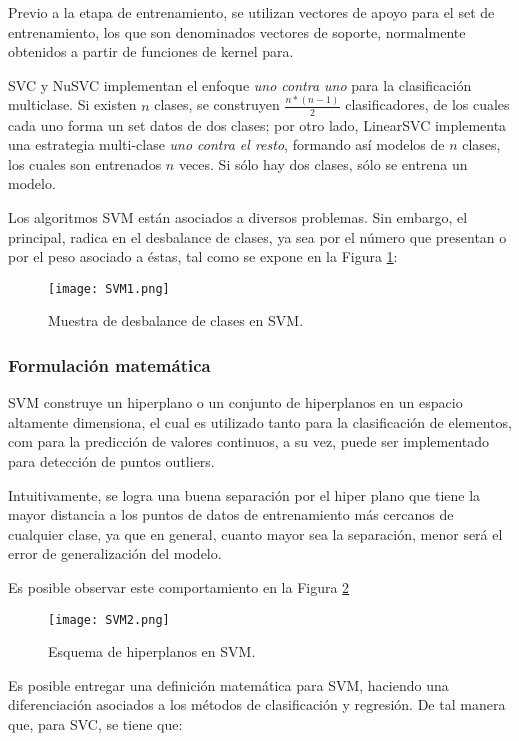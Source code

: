 Previo a la etapa de entrenamiento, se utilizan vectores de apoyo para el set de entrenamiento, los que son denominados vectores de soporte, normalmente obtenidos a partir de funciones de kernel para.

SVC y NuSVC implementan el enfoque \textit{uno contra uno} para la clasificación multiclase. Si existen $n$ clases, se construyen $\frac{n*(n-1)}{2}$ clasificadores, de los cuales cada uno forma un set datos de dos clases; por otro lado, LinearSVC implementa una estrategia multi-clase \textit{uno contra el resto}, formando así modelos de $n$ clases, los cuales son entrenados $n$ veces. Si sólo hay dos clases, sólo se entrena un modelo.

Los algoritmos SVM están asociados a diversos problemas. Sin embargo, el principal, radica en el desbalance de clases, ya sea por el número que presentan o por el peso asociado a éstas, tal como se expone en la Figura  \ref{SVM1}:

\begin{figure}[!h]
	
	\centering
	\texttt{[image: SVM1.png]}
	\caption{Muestra de desbalance de clases en SVM.}
	\label{SVM1}
\end{figure}

\subsubsection{Formulación matemática}

SVM construye un hiperplano o un conjunto de hiperplanos en un espacio altamente dimensiona, el cual es utilizado tanto para la clasificación de elementos, com para la predicción de valores continuos, a su vez, puede ser implementado para detección de puntos outliers. 

Intuitivamente, se logra una buena separación por el hiper plano que tiene la mayor distancia a los puntos de datos de entrenamiento más cercanos de cualquier clase, ya que en general, cuanto mayor sea la separación, menor será el error de generalización del modelo.

Es posible observar este comportamiento en la Figura \ref{SVM2}

\begin{figure}[!h]
	\centering
	\texttt{[image: SVM2.png]}
	\caption{Esquema de hiperplanos en SVM.}
	\label{SVM2}
	
\end{figure}

Es posible entregar una definición matemática para SVM, haciendo una diferenciación asociados a los métodos de clasificación y regresión. De tal manera que, para SVC, se tiene que:

